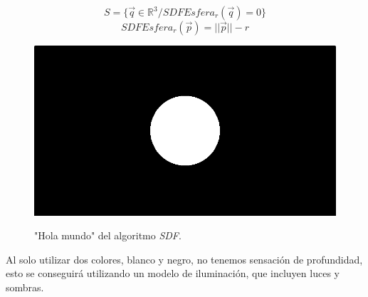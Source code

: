 \[S=\{\Vec{q} \in \mathbb{R}^3 / SDFEsfera_r(\Vec{q})=0\}\]
\[ SDFEsfera_r(\Vec{p})=\vert\vert\Vec{p}\vert\vert - r  \]
\begin{figure}[H]
  \centering
  \captionsetup{justification=centering}%
  \includegraphics[width=1.0\textwidth]{secciones/imagenes/starting/sdf1.png}\label{fig:hello}
  \caption{"Hola mundo" del algoritmo \textit{SDF}.}
\end{figure}
Al solo utilizar dos colores, blanco y negro, no tenemos sensación de profundidad, esto se conseguirá utilizando un modelo de iluminación, que incluyen luces y sombras.